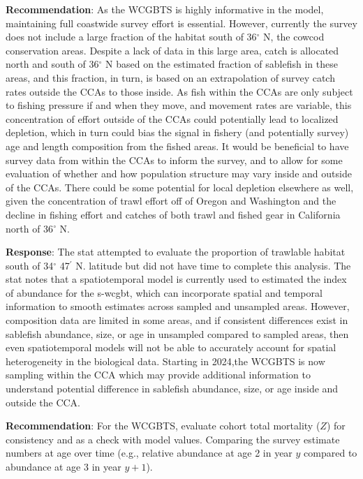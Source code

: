 \documentclass[
  english,
]{article}
\begin{document}
\textbf{Recommendation}: As the WCGBTS is highly informative in the
model, maintaining full coastwide survey effort is essential. However,
currently the survey does not include a large fraction of the habitat
south of 36\(^\circ\) N, the cowcod conservation areas. Despite a lack
of data in this large area, catch is allocated north and south of
36\(^\circ\) N based on the estimated fraction of sablefish in these
areas, and this fraction, in turn, is based on an extrapolation of
survey catch rates outside the CCAs to those inside. As fish within the
CCAs are only subject to fishing pressure if and when they move, and
movement rates are variable, this concentration of effort outside of the
CCAs could potentially lead to localized depletion, which in turn could
bias the signal in fishery (and potentially survey) age and length
composition from the fished areas. It would be beneficial to have survey
data from within the CCAs to inform the survey, and to allow for some
evaluation of whether and how population structure may vary inside and
outside of the CCAs. There could be some potential for local depletion
elsewhere as well, given the concentration of trawl effort off of Oregon
and Washington and the decline in fishing effort and catches of both
trawl and fished gear in California north of 36\(^\circ\) N.

\textbf{Response}: The \gls{stat} attempted to evaluate the proportion
of trawlable habitat south of 34\(^\circ\) 47\(^\prime\) N. latitude but
did not have time to complete this analysis. The \gls{stat} notes that a
spatiotemporal model is currently used to estimated the index of
abundance for the \gls{s-wcgbt}, which can incorporate spatial and
temporal information to smooth estimates across sampled and unsampled
areas. However, composition data are limited in some areas, and if
consistent differences exist in sablefish abundance, size, or age in
unsampled compared to sampled areas, then even spatiotemporal models
will not be able to accurately account for spatial heterogeneity in the
biological data. Starting in 2024,the WCGBTS is now sampling within the
CCA which may provide additional information to understand potential
difference in sablefish abundance, size, or age inside and outside the
CCA.

\textbf{Recommendation}: For the WCGBTS, evaluate cohort total mortality
(\(Z\)) for consistency and as a check with model values. Comparing the
survey estimate numbers at age over time (e.g., relative abundance at
age 2 in year \(y\) compared to abundance at age 3 in year \(y+1\)).
\end{document}
